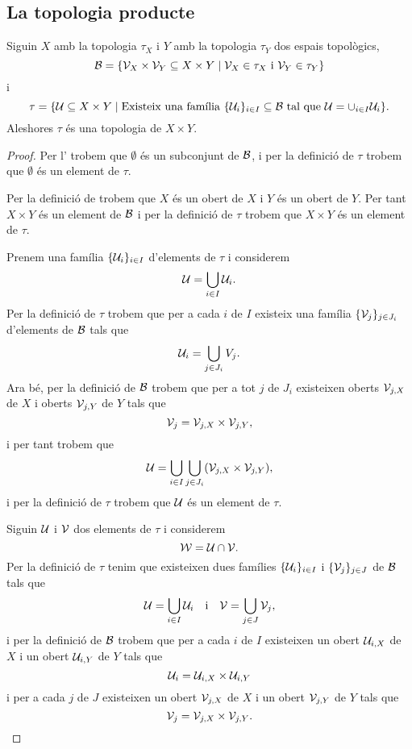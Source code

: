 \documentclass[../../Main.tex]{subfiles}
\begin{document}
	\subsection{La topologia producte}
	\begin{proposition}
		\label{prop:la topologia producte}
		Siguin \(X\) amb la topologia \(\tau_{X}\) i \(Y\) amb la topologia \(\tau_{Y}\) dos espais topològics,
		\[
		    \mathcal{B}=\{\mathcal{V}_{X}\times\mathcal{V}_{Y}\subseteq X\times Y\mid\mathcal{V}_{X}\in\tau_{X}\text{ i }\mathcal{V}_{Y}\in\tau_{Y}\}
		\]
		i
		\[
		    \tau=\{\mathcal{U}\subseteq X\times Y\mid\text{Existeix una família }\{\mathcal{U}_{i}\}_{i\in I}\subseteq\mathcal{B}\text{ tal que }\mathcal{U}=\cup_{i\in I}\mathcal{U}_{i}\}.
		\]
		Aleshores \(\tau\) és una topologia de \(X\times Y\).
		\begin{proof}
			Per l' trobem que \(\emptyset\) és un subconjunt de \(\mathcal{B}\), i per la definició de \(\tau\) trobem que \(\emptyset\) és un element de \(\tau\).
			
			Per la definició de  trobem que \(X\) és un obert de \(X\) i \(Y\) és un obert de \(Y\). Per tant \(X\times Y\) és un element de \(\mathcal{B}\) i per la definició de \(\tau\) trobem que \(X\times Y\) és un element de \(\tau\).
			
			Prenem una família \(\{\mathcal{U}_{i}\}_{i\in I}\) d'elements de \(\tau\) i considerem
			\[
			    \mathcal{U}=\bigcup_{i\in I}\mathcal{U}_{i}.
			\]
			Per la definició de \(\tau\) trobem que per a cada \(i\) de \(I\) existeix una família \(\{\mathcal{V}_{j}\}_{j\in J_{i}}\) d'elements de \(\mathcal{B}\) tals que
			\[
			    \mathcal{U}_{i}=\bigcup_{j\in J_{i}}V_{j}.
			\]
			Ara bé, per la definició de \(\mathcal{B}\) trobem que per a tot \(j\) de \(J_{i}\) existeixen oberts \(\mathcal{V}_{j,X}\) de \(X\) i oberts \(\mathcal{V}_{j,Y}\) de \(Y\) tals que
			\[
			    \mathcal{V}_{j}=\mathcal{V}_{j,X}\times\mathcal{V}_{j,Y},
			\]
			i per tant trobem que
			\[
			    \obert{U}=\bigcup_{i\in I}\bigcup_{j\in J_{i}}\left(\obert{V}_{j,X}\times\obert{V}_{j,Y}\right),
			\]
			i per la definició de \(\tau\) trobem que \(\mathcal{U}\) és un element de \(\tau\).
			
			Siguin \(\mathcal{U}\) i \(\mathcal{V}\) dos elements de \(\tau\) i considerem
			\[
			    \mathcal{W}=\mathcal{U}\cap\mathcal{V}.
			\]
			Per la definició de \(\tau\) tenim que existeixen dues famílies \(\{\mathcal{U}_{i}\}_{i\in I}\) i \(\{\mathcal{V}_{j}\}_{j\in J}\) de \(\mathcal{B}\) tals que
			\[
			    \mathcal{U}=\bigcup_{i\in I}\mathcal{U}_{i}\quad\text{i}\quad\mathcal{V}=\bigcup_{j\in J}\mathcal{V}_{j},
			\]
			i per la definició de \(\mathcal{B}\) trobem que per a cada \(i\) de \(I\) existeixen un obert \(\mathcal{U}_{i,X}\) de \(X\) i un obert \(\mathcal{U}_{i,Y}\) de \(Y\) tals que
			\[
			    \mathcal{U}_{i}=\mathcal{U}_{i,X}\times\mathcal{U}_{i,Y}
			\]
			i per a cada \(j\) de \(J\) existeixen un obert \(\mathcal{V}_{j,X}\) de \(X\) i un obert \(\mathcal{V}_{j,Y}\) de \(Y\) tals que
			\[
			    \mathcal{V}_{j}=\mathcal{V}_{j,X}\times\mathcal{V}_{j,Y}.
			\]
			

\end{proof}
\end{proposition}
\end{document}
